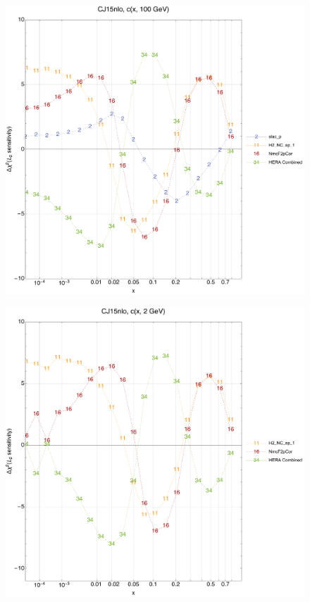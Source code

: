 \documentclass[10pt,aps,prd,floatfix,titlepage]{revtex4}
\begin{document}
\clearpage
\begin{figure}
\includegraphics[width=\textwidth,height=0.44\textheight,keepaspectratio]{1/ifl4_CJ15nlo_L2_q100_Sf_1.pdf}
\caption{}
\end{figure}
\begin{figure}
\includegraphics[width=\textwidth,height=0.44\textheight,keepaspectratio]{1/ifl4_CJ15nlo_L2_q2_Sf_1.pdf}
\caption{}
\end{figure}
\end{document}
